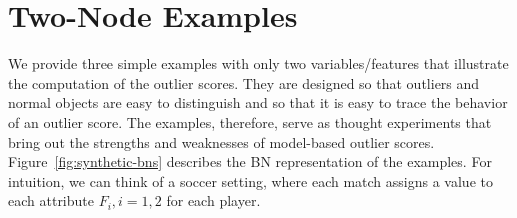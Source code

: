 		
		
		\section{Two-Node Examples} \label{sec:divergence-examples} 
		
		
		We provide three simple examples with only two variables/features that illustrate the computation of the outlier scores. They are designed so that outliers and normal objects are easy to distinguish and so that it is easy to trace the behavior of an outlier score.
		The examples, therefore, serve as thought experiments that bring out the strengths and weaknesses of model-based outlier scores. 
		Figure~\ref{fig:synthetic-bns} describes the BN representation of the examples. For intuition, we can think of a soccer setting, where each match assigns a value to each attribute $F_i, i =  1,2$ for each player. 
		
